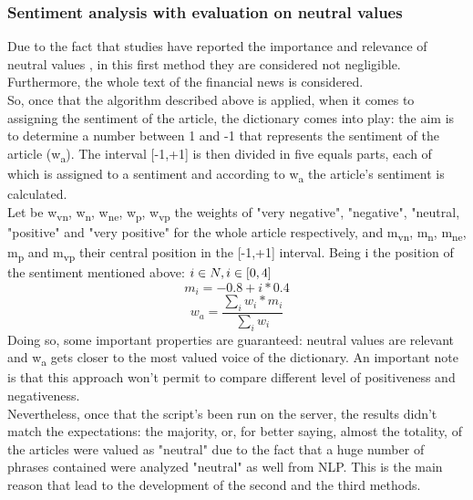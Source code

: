 \subsubsection{Sentiment analysis with evaluation on neutral values}
Due to the fact that studies have reported the importance and relevance of neutral values \cite{neutralvalues}, in this first method they are considered not negligible. Furthermore, the whole text of the financial news is considered.\\
So, once that the algorithm described above is applied, when it comes to assigning the sentiment of the article, the dictionary comes into play: the aim is to determine a number between 1 and -1 that represents the sentiment of the article (w\textsubscript{a}). The interval [-1,+1] is then divided in five equals parts, each of which is assigned to a sentiment and according to w\textsubscript{a} the article's sentiment is calculated.\\
Let be w\textsubscript{vn}, w\textsubscript{n}, w\textsubscript{ne}, w\textsubscript{p}, w\textsubscript{vp} the weights of "very negative", "negative", "neutral, "positive" and "very positive" for the whole article respectively, and m\textsubscript{vn}, m\textsubscript{n}, m\textsubscript{ne}, m\textsubscript{p} and m\textsubscript{vp} their central position in the [-1,+1] interval. Being i the position of the sentiment mentioned above:\newline \newline
\begin{math}
i \in N, i \in [0,4] \\
\end{math}
\begin{equation}
m_i= -0.8+i*0.4
\end{equation}
\begin{equation}
w_a = \frac{\sum\limits_{i} w_i * m_i}{\sum\limits_{i} w_i}
\end{equation}
Doing so, some important properties are guaranteed: neutral values are relevant and w\textsubscript{a} gets closer to the most valued voice of the dictionary. An important note is that this approach won't permit to compare different level of positiveness and negativeness. \\
Nevertheless, once that the script's been run on the server, the results didn't match the expectations: the majority, or, for better saying, almost the totality, of the articles were valued as "neutral" due to the fact that a huge number of phrases contained were analyzed "neutral" as well from NLP. This is the main reason that lead to the development of the second and the third methods.

